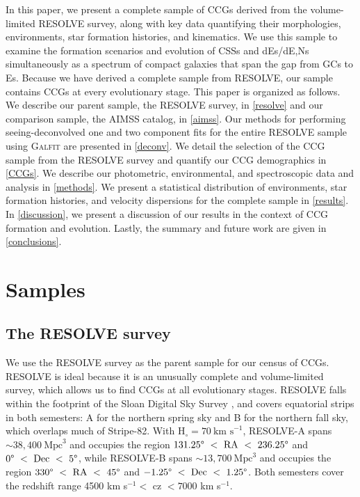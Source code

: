 \documentclass[iop,apj]{emulateapj}
\begin{document}
In this paper, we present a complete sample of CCGs derived from the volume-limited RESOLVE survey, along with key data quantifying their morphologies, environments, star formation histories, and kinematics. We use this sample to examine the formation scenarios and evolution of CSSs and dEs/dE,Ns simultaneously as a spectrum of compact galaxies that span the gap from GCs to Es. Because we have derived a complete sample from RESOLVE, our sample contains CCGs at every evolutionary stage. This paper is organized as follows. We describe our parent sample, the RESOLVE survey, in \autoref{resolve} and our comparison sample, the AIMSS catalog, in \autoref{aimss}. Our methods for performing seeing-deconvolved one and two component fits for the entire RESOLVE sample using \textsc{Galfit} are presented in \autoref{deconv}. We detail the selection of the CCG sample from the RESOLVE survey and quantify our CCG demographics in \autoref{CCGs}. We describe our photometric, environmental, and spectroscopic data and analysis in \autoref{methods}. We present a statistical distribution of environments, star formation histories, and velocity dispersions for the complete sample in \autoref{results}. In \autoref{discussion}, we present a discussion of our results in the context of CCG formation and evolution. Lastly, the summary and future work are given in \autoref{conclusions}.

\section{Samples}
\label{samples}

\subsection{The RESOLVE survey}
\label{resolve}

  We use the RESOLVE survey \citep[][Kannappan et al., in prep]{Kannappan2008} as the parent sample for our census of CCGs. RESOLVE is ideal because it is an unusually complete and volume-limited survey, which allows us to find CCGs at all evolutionary stages. RESOLVE falls within the footprint of the Sloan Digital Sky Survey \citep[SDSS,][]{York2000}, and covers equatorial strips in both semesters: A for the northern spring sky and B for the northern fall sky, which overlaps much of Stripe-82. With $\text{H}_{\circ} = 70~\text{km~s}^{-1}$, RESOLVE-A spans $\sim38,400~\text{Mpc}^3$ and occupies the region $131.25\degree~<~\text{RA}~<~236.25\degree$ and $0\degree~<~\text{Dec}~<~5\degree$, while RESOLVE-B spans $\sim13,700~\text{Mpc}^3$ and occupies the region $330\degree~<~\text{RA}~<~45\degree$ and $-1.25\degree~<~\text{Dec}~<~1.25\degree$. Both semesters cover the redshift range 4500 km s$^{-1} <$ cz $< 7000$ km s$^{-1}$.
\end{document}
